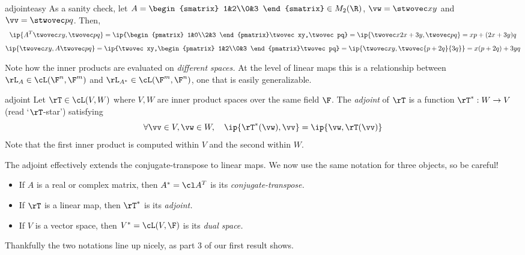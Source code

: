 \begin{example}{}{adjointeasy}
As a sanity check, let $A=\begin{smatrix}
1&2\\0&3
\end{smatrix}\in M_2(\R)$, $\vw=\stwovec xy$ and $\vv=\stwovec pq$. Then,
\begin{gather*}
\ip{A^T\twovec xy,\twovec pq}
=\ip{\begin{pmatrix}
1&0\\2&3
\end{pmatrix}\twovec xy,\twovec pq}
=\ip{\twovec x{2x+3y},\twovec pq}
=xp+(2x+3y)q\\[5pt]
\ip{\twovec xy,A\twovec pq}
=\ip{\twovec xy,\begin{pmatrix}
1&2\\0&3
\end{pmatrix}\twovec pq}
=\ip{\twovec xy,\twovec{p+2q}{3q}}
=x(p+2q)+3yq
\end{gather*}
\end{example}

Note how the inner products are evaluated on \emph{different spaces.} At the level of linear maps this is a relationship between $\rL_A\in\cL(\F^n,\F^m)$ and $\rL_{A^*}\in\cL(\F^m,\F^n)$, one that is easily generalizable.

\begin{defn}{}{adjoint}
Let $\rT\in\cL(V,W)$ where $V,W$ are inner product spaces over the same field $\F$. The \emph{adjoint} of $\rT$ is a function $\rT^*:W\to V$ (read `$\rT$-star') satisfying
\[\forall \vv\in V,\vw\in W,\quad \ip{\rT^*(\vw),\vv}=\ip{\vw,\rT(\vv)}\]
Note that the first inner product is computed within $V$ and the second within $W$.
\end{defn}

The adjoint effectively extends the conjugate-transpose to linear maps. We now use the same notation for three objects, so be careful!
\begin{itemize}
  \item If $A$ is a real or complex matrix, then $A^*=\cl A^T$ is its \emph{conjugate-transpose.}
  \item If $\rT$ is a linear map, then $\rT^*$ is its \emph{adjoint.}
  \item If $V$ is a vector space, then $V^*=\cL(V,\F)$ is its \emph{dual space.}
\end{itemize}
Thankfully the two notations line up nicely, as part 3 of our first result shows.

